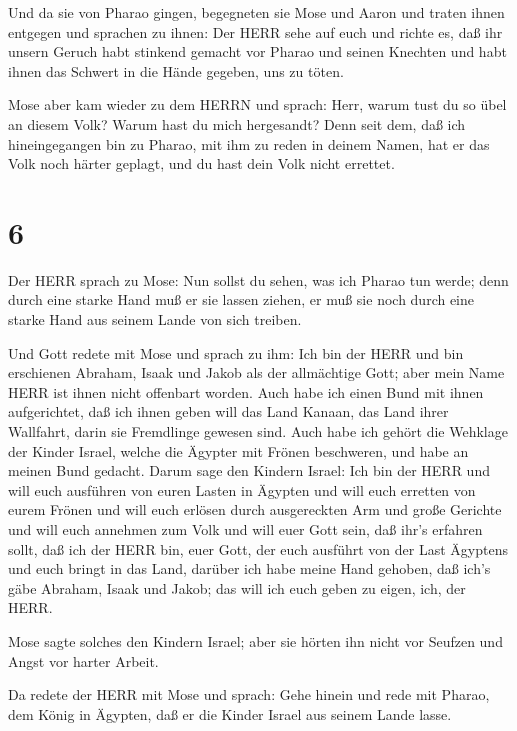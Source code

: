  Und da sie von Pharao gingen, begegneten sie Mose und
Aaron und traten ihnen entgegen  und sprachen zu ihnen: Der
HERR sehe auf euch und richte es, daß ihr unsern Geruch habt stinkend
gemacht vor Pharao und seinen Knechten und habt ihnen das Schwert in die
Hände gegeben, uns zu töten.

 Mose aber kam wieder zu dem HERRN und sprach: Herr, warum
tust du so übel an diesem Volk? Warum hast du mich hergesandt?
 Denn seit dem, daß ich hineingegangen bin zu Pharao, mit
ihm zu reden in deinem Namen, hat er das Volk noch härter geplagt, und
du hast dein Volk nicht errettet.

\hypertarget{section-5}{%
\section{6}\label{section-5}}

 Der HERR sprach zu Mose: Nun sollst du sehen, was ich
Pharao tun werde; denn durch eine starke Hand muß er sie lassen ziehen,
er muß sie noch durch eine starke Hand aus seinem Lande von sich
treiben.

 Und Gott redete mit Mose und sprach zu ihm: Ich bin der
HERR  und bin erschienen Abraham, Isaak und Jakob als der
allmächtige Gott; aber mein Name HERR ist ihnen nicht offenbart worden.
 Auch habe ich einen Bund mit ihnen aufgerichtet, daß ich
ihnen geben will das Land Kanaan, das Land ihrer Wallfahrt, darin sie
Fremdlinge gewesen sind.  Auch habe ich gehört die Wehklage
der Kinder Israel, welche die Ägypter mit Frönen beschweren, und habe an
meinen Bund gedacht.  Darum sage den Kindern Israel: Ich bin
der HERR und will euch ausführen von euren Lasten in Ägypten und will
euch erretten von eurem Frönen und will euch erlösen durch ausgereckten
Arm und große Gerichte  und will euch annehmen zum Volk und
will euer Gott sein, daß ihr's erfahren sollt, daß ich der HERR bin,
euer Gott, der euch ausführt von der Last Ägyptens  und euch
bringt in das Land, darüber ich habe meine Hand gehoben, daß ich's gäbe
Abraham, Isaak und Jakob; das will ich euch geben zu eigen, ich, der
HERR.

 Mose sagte solches den Kindern Israel; aber sie hörten ihn
nicht vor Seufzen und Angst vor harter Arbeit.

 Da redete der HERR mit Mose und sprach:  Gehe
hinein und rede mit Pharao, dem König in Ägypten, daß er die Kinder
Israel aus seinem Lande lasse.

